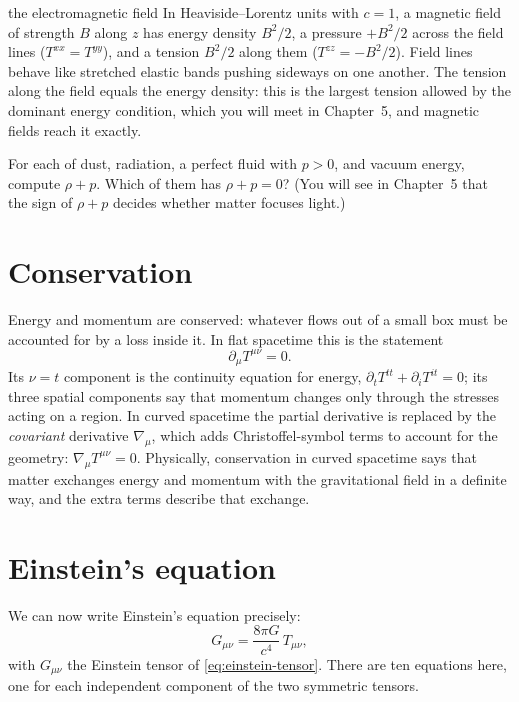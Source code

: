 \begin{deeper}{the electromagnetic field}
In Heaviside--Lorentz units with $c = 1$, a magnetic field of strength $B$
along $z$ has energy density $B^{2}/2$, a pressure $+B^{2}/2$ across the field
lines ($T^{xx} = T^{yy}$), and a tension $B^{2}/2$ along them
($T^{zz} = -B^{2}/2$). Field lines behave like stretched elastic bands pushing
sideways on one another. The tension along the field equals the energy density:
this is the largest tension allowed by the dominant energy condition, which you
will meet in Chapter~5, and magnetic fields reach it exactly.
\end{deeper}

\begin{checkpoint}
For each of dust, radiation, a perfect fluid with $p > 0$, and vacuum energy,
compute $\rho + p$. Which of them has $\rho + p = 0$? (You will see in Chapter~5
that the sign of $\rho + p$ decides whether matter focuses light.)
\end{checkpoint}

\section{Conservation}\label{sec:conservation}

Energy and momentum are conserved: whatever flows out of a small box must be
accounted for by a loss inside it. In flat spacetime this is the statement
\begin{equation}
  \partial_{\mu}T^{\mu\nu} = 0 .
  \label{eq:conservation-flat}
\end{equation}
Its $\nu = t$ component is the continuity equation for energy,
$\partial_{t}T^{tt} + \partial_{i}T^{it} = 0$; its three spatial components say
that momentum changes only through the stresses acting on a region. In curved
spacetime the partial derivative is replaced by the \emph{covariant} derivative
$\nabla_{\mu}$, which adds Christoffel-symbol terms to account for the geometry:
$\nabla_{\mu}T^{\mu\nu} = 0$. Physically, conservation in curved spacetime says
that matter exchanges energy and momentum with the gravitational field in a
definite way, and the extra terms describe that exchange.

\section{Einstein's equation}\label{sec:einstein}

We can now write Einstein's equation precisely:
\begin{equation}
  G_{\mu\nu} = \frac{8\pi G}{c^{4}}\,T_{\mu\nu},
  \label{eq:einstein-si}
\end{equation}
with $G_{\mu\nu}$ the Einstein tensor of \cref{eq:einstein-tensor}. There are ten
equations here, one for each independent component of the two symmetric
tensors.

